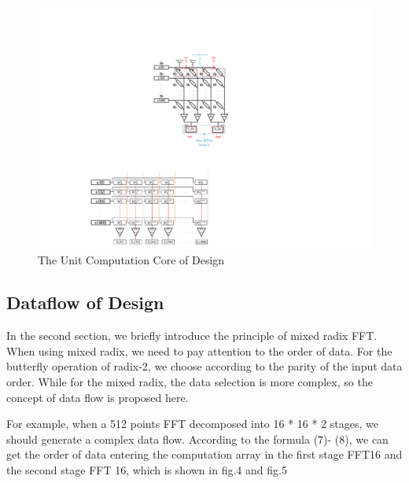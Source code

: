 \documentclass[journal]{IEEEtran}
\begin{document}
\begin{figure}[h]
\centering
\includegraphics[scale=0.6]{figures/figure3}
\caption{The Unit Computation Core of Design}
\end{figure}


\subsection{Dataflow of Design}
In the second section, we briefly introduce the principle of mixed radix FFT. When using mixed radix, we need to pay attention to the order of data. For the butterfly operation of radix-2, we choose according to the parity of the input data order. While for the mixed radix, the data selection is more complex, so the concept of data flow is proposed here.

For example, when a 512 points FFT decomposed into 16 * 16 * 2 stages, we should generate a complex data flow. According to the formula (7)- (8), we can get the order of data entering the computation array in the first stage FFT16  and the second stage FFT 16, which is shown in fig.4 and fig.5
\end{document}
